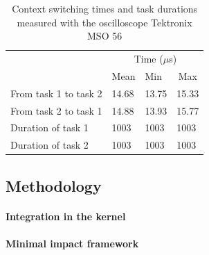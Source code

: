 \begin{table}[!ht]
  \centering
  \begin{tabular}{llll}
                        & \multicolumn{3}{c}{Time ($\mu$s)}                              \\ \cline{2-4} 
                        & \multicolumn{1}{c}{Mean} & Min   & \multicolumn{1}{c}{Max} \\ \cline{2-4} 
  From task 1 to task 2 & 14.68                    & 13.75 & 15.33                   \\
  From task 2 to task 1 & 14.88                    & 13.93 & 15.77                   \\
  Duration of task 1    & 1003                     & 1003  & 1003                    \\
  Duration of task 2    & 1003                     & 1003  & 1003                   
  \end{tabular}
  \caption{Context switching times and task durations measured with the oscilloscope Tektronix MSO 56}
  \label{tab:reference-measurement}
\end{table}


\subsection{Methodology}

\paragraph{Integration in the kernel}

\paragraph{Minimal impact framework}